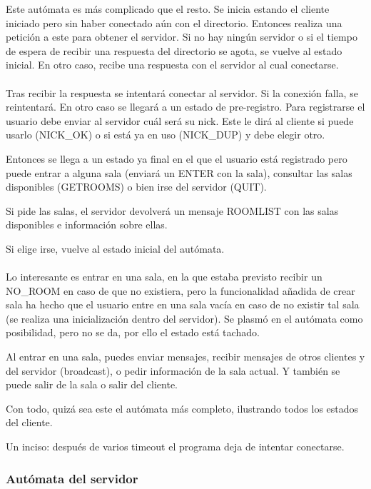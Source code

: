 \documentclass{article}
\begin{document}
Este autómata es más complicado que el resto. Se inicia estando el cliente iniciado pero sin haber conectado aún con el directorio. Entonces realiza una petición a este para obtener el servidor. Si no hay ningún servidor o si el tiempo de espera de recibir una respuesta del directorio se agota, se vuelve al estado inicial. En otro caso, recibe una respuesta con el servidor al cual conectarse.\\\\

Tras recibir la respuesta se intentará conectar al servidor. Si la conexión falla, se reintentará. En otro caso se llegará a un estado de pre-registro. Para registrarse el usuario debe enviar al servidor cuál será su nick. Este le dirá al cliente si puede usarlo (NICK\_OK) o si está ya en uso (NICK\_DUP) y debe elegir otro.

Entonces se llega a un estado ya final en el que el usuario está registrado pero puede entrar a alguna sala (enviará un ENTER con la sala), consultar las salas disponibles (GETROOMS) o bien irse del servidor (QUIT).

Si pide las salas, el servidor devolverá un mensaje ROOMLIST con las salas disponibles e información sobre ellas.

Si elige irse, vuelve al estado inicial del autómata.\\\\

Lo interesante es entrar en una sala, en la que estaba previsto recibir un NO\_ROOM en caso de que no existiera, pero la funcionalidad añadida de crear sala ha hecho que el usuario entre en una sala vacía en caso de no existir tal sala (se realiza una inicialización dentro del servidor). Se plasmó en el autómata como posibilidad, pero no se da, por ello el estado está tachado.

Al entrar en una sala, puedes enviar mensajes, recibir mensajes de otros clientes y del servidor (broadcast), o pedir información de la sala actual. Y también se puede salir de la sala o salir del cliente.

Con todo, quizá sea este el autómata más completo, ilustrando todos los estados del cliente.

Un inciso: después de varios timeout el programa deja de intentar conectarse.

\subsubsection{Autómata del servidor}
\end{document}
